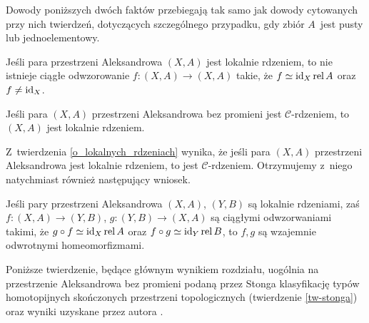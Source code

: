 Dowody poniższych dwóch faktów przebiegają tak samo jak dowody cytowanych przy nich twierdzeń, dotyczących szczególnego przypadku, gdy zbiór $A$~jest pusty lub jednoelementowy.

\begin{tw}\label{o_lokalnych_rdzeniach}Jeśli para przestrzeni Aleksandrowa $(X,A)$ jest lokalnie rdzeniem, to nie istnieje ciągłe odwzorowanie $f\colon (X,A)\to (X,A)$ takie, że $f\simeq \operatorname{id}_X \operatorname{rel} A$ oraz $f\not=\operatorname{id}_X$.
\end{tw}

\begin{stw}\label{fp_rdzenie_sa_lokalne}
Jeśli para $(X,A)$ przestrzeni Aleksandrowa bez promieni jest $\mathcal{C}$-rdzeniem, to $(X,A)$ jest lokalnie rdzeniem.
\end{stw}

Z~twierdzenia \ref{o_lokalnych_rdzeniach} wynika, że jeśli para $(X,A)$ przestrzeni Aleksandrowa jest lokalnie rdzeniem, to jest $\mathcal{C}$-rdzeniem. Otrzymujemy z~niego natychmiast również  następujący wniosek.
\begin{wn}\label{lokalne_sa_dobre}
Jeśli pary przestrzeni Aleksandrowa $(X,A)$, $(Y,B)$ są lokalnie rdzeniami, zaś $f\colon (X,A)\to (Y,B)$, $g\colon (Y,B)\to (X,A)$ są ciągłymi odwzorwaniami takimi, że $g\circ f\simeq \operatorname{id}_X \operatorname{rel} A$ oraz $f\circ g\simeq \operatorname{id}_Y \operatorname{rel} B$, to $f,g$ są wzajemnie odwrotnymi homeomorfizmami.
\end{wn}

Poniższe twierdzenie, będące głównym wynikiem rozdziału, uogólnia na przestrzenie Aleksandrowa bez promieni podaną przez Stonga klasyfikację typów homotopijnych skończonych przestrzeni topologicznych (twierdzenie \ref{tw-stonga}) oraz wyniki uzyskane przez autora \cite{Kukiela10a,Kukiela10}.

